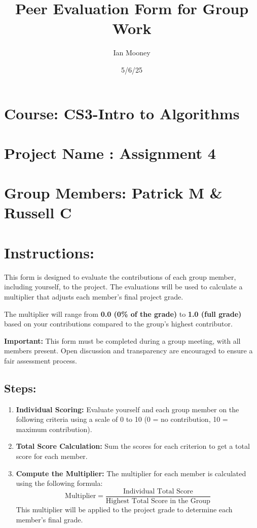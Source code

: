 \documentclass{article}
\title{Peer Evaluation Form for Group Work}
\author{Ian Mooney}
\date{5/6/25}
\begin{document}
\maketitle

\section*{Course: CS3-Intro to Algorithms}
\vspace{0.5cm}

\section*{Project Name : Assignment 4}
\vspace{0.5cm}

\section*{Group Members: Patrick M \& Russell C}
\vspace{1cm}

\section*{Instructions:}

This form is designed to evaluate the contributions of each group member, including yourself, to the project. The evaluations will be used to calculate a multiplier that adjusts each member's final project grade. 

The multiplier will range from \textbf{0.0 (0\% of the grade)} to \textbf{1.0 (full grade)} based on your contributions compared to the group’s highest contributor.

\textbf{Important:} This form must be completed during a group meeting, with all members present. Open discussion and transparency are encouraged to ensure a fair assessment process.

\subsection*{Steps:}

\begin{enumerate}
    \item \textbf{Individual Scoring:} Evaluate yourself and each group member on the following criteria using a scale of 0 to 10 (0 = no contribution, 10 = maximum contribution).
    \item \textbf{Total Score Calculation:} Sum the scores for each criterion to get a total score for each member.
    \item \textbf{Compute the Multiplier:} The multiplier for each member is calculated using the following formula:
    \[
    \text{Multiplier} = \frac{\text{Individual Total Score}}{\text{Highest Total Score in the Group}}
    \]
    This multiplier will be applied to the project grade to determine each member’s final grade.
\end{enumerate}
\end{document}
